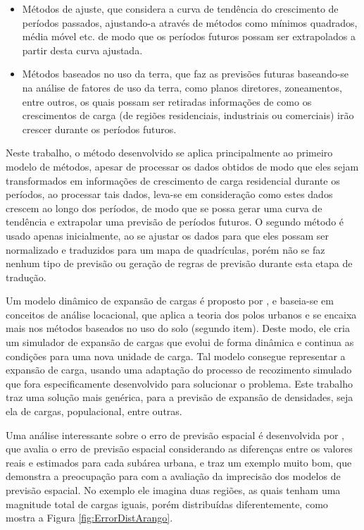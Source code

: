 \begin{itemize}
\item Métodos de ajuste, que considera a curva de tendência do crescimento de períodos passados, ajustando-a através de métodos como mínimos quadrados, média móvel etc. de modo que os períodos futuros possam ser extrapolados a partir desta curva ajustada.
\item Métodos baseados no uso da terra, que faz as previsões futuras baseando-se na análise de fatores de uso da terra, como planos diretores, zoneamentos, entre outros, os quais possam ser retiradas informações de como os crescimentos de carga (de regiões residenciais, industriais ou comerciais) irão crescer durante os períodos futuros.
\end{itemize}

Neste trabalho, o método desenvolvido se aplica principalmente ao primeiro modelo de métodos, apesar de processar os dados obtidos de modo que eles sejam transformados em informações de crescimento de carga residencial durante os períodos, ao processar tais dados, leva-se em consideração como estes dados crescem ao longo dos períodos, de modo que se possa gerar uma curva de tendência e extrapolar uma previsão de períodos futuros. O segundo método é usado apenas inicialmente, ao se ajustar os dados para que eles possam ser normalizado e traduzidos para um mapa de quadrículas, porém não se faz nenhum tipo de previsão ou geração de regras de previsão durante esta etapa de tradução.

Um modelo dinâmico de expansão de cargas é proposto por \citeauthor{arango2000thesis} \cite{arango2000thesis}, e baseia-se em conceitos de análise locacional, que aplica a teoria dos polos urbanos e se encaixa mais nos métodos baseados no uso do solo (segundo item). Deste modo, ele cria um simulador de expansão de cargas que evolui de forma dinâmica e continua as condições para uma nova unidade de carga. Tal modelo consegue representar a expansão de carga, usando uma adaptação do processo de recozimento simulado que fora especificamente desenvolvido para solucionar o problema. Este trabalho traz uma solução mais genérica, para a previsão de expansão de densidades, seja ela de cargas, populacional, entre outras.

Uma análise interessante sobre o erro de previsão espacial é desenvolvida por \citeauthor{arango2000thesis} \cite{arango2000thesis}, que avalia o erro de previsão espacial considerando as diferenças entre os valores reais e estimados para cada subárea urbana, e traz um exemplo muito bom, que demonstra a preocupação para com a avaliação da imprecisão dos modelos de previsão espacial. No exemplo ele imagina duas regiões, as quais tenham uma magnitude total de cargas iguais, porém distribuídas diferentemente, como mostra a Figura \ref{fig:ErrorDistArango}.

